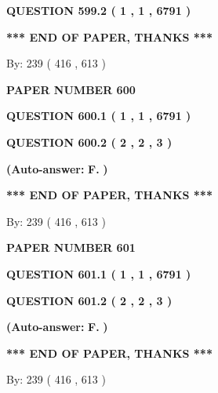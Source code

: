 \documentclass[12pt]{article}
\begin{document}
 
  
  
{\textbf{\large{QUESTION
599.2 
 ( 1 , 1 , 6791 )
}}}
   
   
   
   
\vspace{1.0in} 
{\textbf{\large{ *** END OF PAPER, THANKS *** }}} 
   
   
\hspace{1.0in} By: 
 239 ( 416 ,  613 )
   
   
   
   
\newpage 
\setcounter{page}{ 
   600001 } 
   
   
 {\textbf{ \Large{ PAPER NUMBER  600  }}}
   
   
   
   
  
  
{\textbf{\large{QUESTION
600.1 
 ( 1 , 1 , 6791 )
}}}
  
  
{\textbf{\large{QUESTION
600.2 
 ( 2 , 2 , 3 )
}}}
 
 
{\textbf{(Auto-answer:}}
{\textbf{\large{
F.}}}
{\textbf{)}}
 
 
   
   
   
   
\vspace{1.0in} 
{\textbf{\large{ *** END OF PAPER, THANKS *** }}} 
   
   
\hspace{1.0in} By: 
 239 ( 416 ,  613 )
   
   
   
   
\newpage 
\setcounter{page}{ 
   601001 } 
   
   
 {\textbf{ \Large{ PAPER NUMBER  601  }}}
   
   
   
   
  
  
{\textbf{\large{QUESTION
601.1 
 ( 1 , 1 , 6791 )
}}}
  
  
{\textbf{\large{QUESTION
601.2 
 ( 2 , 2 , 3 )
}}}
 
 
{\textbf{(Auto-answer:}}
{\textbf{\large{
F.}}}
{\textbf{)}}
 
 
   
   
   
   
\vspace{1.0in} 
{\textbf{\large{ *** END OF PAPER, THANKS *** }}} 
   
   
\hspace{1.0in} By: 
 239 ( 416 ,  613 )
   
   
   
   
\newpage 
\setcounter{page}{ 
   602001 } 
   
\end{document}
